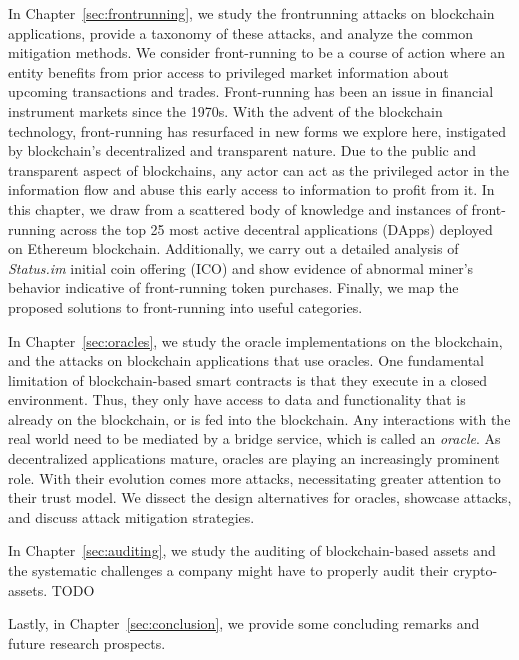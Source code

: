 In Chapter~\ref{sec:frontrunning}, we study the frontrunning attacks on blockchain applications, provide a taxonomy of these attacks, and analyze the common mitigation methods. We consider front-running to be a course of action where an entity benefits from prior access to privileged market information about upcoming transactions and trades. Front-running has been an issue in financial instrument markets since the 1970s. With the advent of the blockchain technology, front-running has resurfaced in new forms we explore here, instigated by blockchain’s decentralized and transparent nature. Due to the public and transparent aspect of blockchains, any actor can act as the privileged actor in the information flow and abuse this early access to information to profit from it. In this chapter, we draw from a scattered body of knowledge and instances of front-running across the top 25 most active decentral applications (DApps) deployed on Ethereum blockchain. Additionally, we carry out a detailed analysis of \textit{Status.im} initial coin offering (ICO) and show evidence of abnormal miner’s behavior indicative of front-running token purchases. Finally, we map the proposed solutions to front-running into useful categories.


In Chapter~\ref{sec:oracles}, we study the oracle implementations on the blockchain, and the attacks on blockchain applications that use oracles. One fundamental limitation of blockchain-based smart contracts is that they execute in a closed environment. Thus, they only have access to data and functionality that is already on the blockchain, or is fed into the blockchain. Any interactions with the real world need to be mediated by a bridge service, which is called an \textit{oracle}. As decentralized applications mature, oracles are playing an increasingly prominent role. With their evolution comes more attacks, necessitating greater attention to their trust model. We dissect the design alternatives for oracles, showcase attacks, and discuss attack mitigation strategies.


In Chapter~\ref{sec:auditing}, we study the auditing of blockchain-based assets and the systematic challenges a company might have to properly audit their crypto-assets. TODO %


Lastly, in Chapter~\ref{sec:conclusion}, we provide some concluding remarks and future research prospects.


